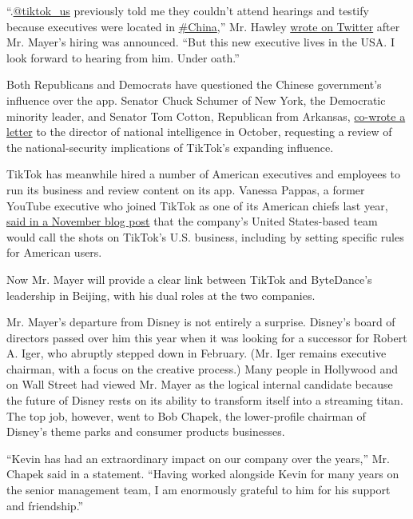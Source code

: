 ``.\href{https://twitter.com/tiktok_us}{@tiktok\_us} previously told me
they couldn't attend hearings and testify because executives were
located in
\href{https://twitter.com/hashtag/China?src=hashtag_click}{\#China},''
Mr. Hawley
\href{https://twitter.com/HawleyMO/status/1262498756555046913?s=20}{wrote
on Twitter} after Mr. Mayer's hiring was announced. ``But this new
executive lives in the USA. I look forward to hearing from him. Under
oath.''

Both Republicans and Democrats have questioned the Chinese government's
influence over the app. Senator Chuck Schumer of New York, the
Democratic minority leader, and Senator Tom Cotton, Republican from
Arkansas,
\href{https://www.democrats.senate.gov/imo/media/doc/10232019\%20TikTok\%20Letter\%20-\%20FINAL\%20PDF.pdf}{co-wrote
a letter} to the director of national intelligence in October,
requesting a review of the national-security implications of TikTok's
expanding influence.

TikTok has meanwhile hired a number of American executives and employees
to run its business and review content on its app. Vanessa Pappas, a
former YouTube executive who joined TikTok as one of its American chiefs
last year,
\href{https://newsroom.tiktok.com/en-us/explaining-tiktoks-approach-in-the-us}{said
in a November blog post} that the company's United States-based team
would call the shots on TikTok's U.S. business, including by setting
specific rules for American users.

Now Mr. Mayer will provide a clear link between TikTok and ByteDance's
leadership in Beijing, with his dual roles at the two companies.

Mr. Mayer's departure from Disney is not entirely a surprise. Disney's
board of directors passed over him this year when it was looking for a
successor for Robert A. Iger, who abruptly stepped down in February.
(Mr. Iger remains executive chairman, with a focus on the creative
process.) Many people in Hollywood and on Wall Street had viewed Mr.
Mayer as the logical internal candidate because the future of Disney
rests on its ability to transform itself into a streaming titan. The top
job, however, went to Bob Chapek, the lower-profile chairman of Disney's
theme parks and consumer products businesses.

``Kevin has had an extraordinary impact on our company over the years,''
Mr. Chapek said in a statement. ``Having worked alongside Kevin for many
years on the senior management team, I am enormously grateful to him for
his support and friendship.''

